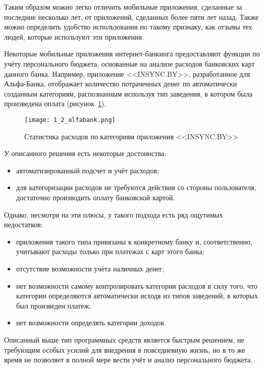 Таким образом можно легко отличить мобильные приложения, сделанные за последние несколько лет, от приложений, сделанных более пяти лет назад.
Также можно определить удобство использования по такому признаку, как отзывы тех людей, которые используют эти приложения.

Некоторые мобильные приложения интернет-банкинга предоставляют функции по учёту персонального бюджета, основанные на анализе расходов банковских карт данного банка.
Например, приложение <<INSYNC.BY>>, разработанное для Альфа-Банка, отображает количество потраченных денег по автоматически созданным категориям, распознанным используя тип заведения, в котором была произведена оплата (рисунок~\ref{fig:analysis:analogues:alfabank}).

\begin{figure}[H]
    \centering
    \texttt{[image: 1\_2\_alfabank.png]}
    \caption{Статистика расходов по категориям приложения <<INSYNC.BY>>}
    \label{fig:analysis:analogues:alfabank}
\end{figure}

У описанного решения есть некоторые достоинства:
\begin{itemize}
    \item автоматизированный подсчет и учёт расходов;
    \item для категоризации расходов не требуются действия со стороны пользователя, достаточно производить оплату банковской картой.
\end{itemize}

Однако, несмотря на эти плюсы, у такого подхода есть ряд ощутимых недостатков:
\begin{itemize}
    \item приложения такого типа привязаны к конкретному банку и, соответственно, учитывают расходы только при платежах с карт этого банка;
    \item отсутствие возможности учёта наличных денег;
    \item нет возможности самому контролировать категории расходов в силу того, что категории определяются автоматически исходя из типов заведений, в которых был произведен платеж;
    \item нет возможности определять категории доходов.
\end{itemize}

Описанный выше тип программных средств является быстрым решением, не требующим особых усилий для внедрения в повседневную жизнь, но в то же время не позволяет в полной мере вести учёт и анализ персонального бюджета.


